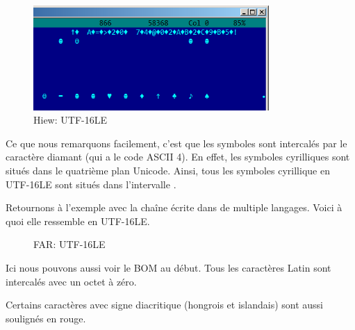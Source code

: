 \begin{figure}[H]
\centering
\includegraphics[width=0.8\textwidth]{digging_into_code/strings/russian_UTF16.png}
\caption{Hiew: UTF-16LE}
\end{figure}

Ce que nous remarquons facilement, c'est que les symboles sont intercalés par le
caractère diamant (qui a le code ASCII 4). En effet, les symboles cyrilliques sont
situés dans le quatrième plan Unicode.
Ainsi, tous les symboles cyrillique en UTF-16LE sont situés dans l'intervalle .

Retournons à l'exemple avec la chaîne écrite dans de multiple langages.
Voici à quoi elle ressemble en UTF-16LE.

\begin{figure}[H]
\centering
{}
\caption{FAR: UTF-16LE}
\end{figure}

Ici nous pouvons aussi voir le \ac{BOM} au début.
Tous les caractères Latin sont intercalés avec un octet à zéro.

Certains caractères avec signe diacritique (hongrois et islandais) sont aussi soulignés en rouge.



